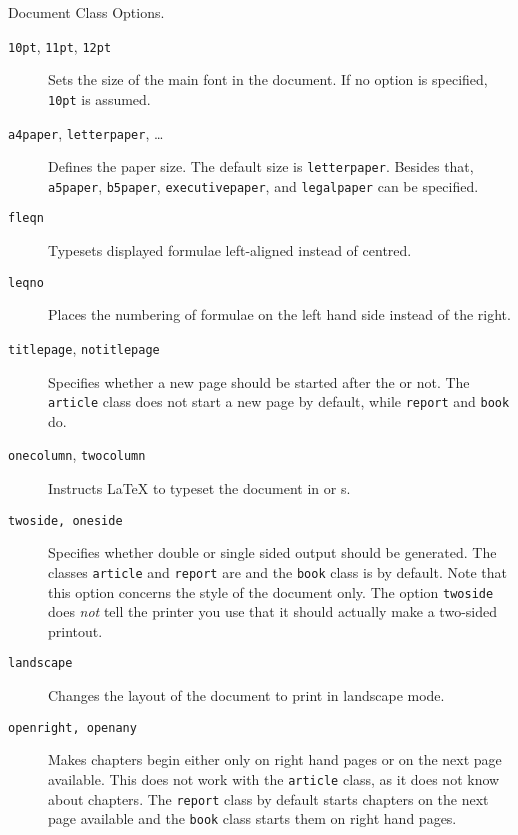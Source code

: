 \begin{table}[!bp]
\caption{Document Class Options.} \label{options}
\begin{lined}{12cm}
\begin{flushleft}
\begin{description}
\item[\normalfont\texttt{10pt}, \texttt{11pt}, \texttt{12pt}] \quad Sets the size
  of the main font in the document. If no option is specified,
  \texttt{10pt} is assumed.  
\item[\normalfont\texttt{a4paper}, \texttt{letterpaper}, \ldots] \quad Defines
  the paper size. The default size is \texttt{letterpaper}. Besides
  that, \texttt{a5paper}, \texttt{b5paper}, \texttt{executivepaper},
  and \texttt{legalpaper} can be specified.  
   

\item[\normalfont\texttt{fleqn}] \quad Typesets displayed formulae left-aligned
  instead of centred.

\item[\normalfont\texttt{leqno}] \quad Places the numbering of formulae on the
  left hand side instead of the right.

\item[\normalfont\texttt{titlepage}, \texttt{notitlepage}] \quad Specifies
  whether a new page should be started after the 
  or not. The \texttt{article} class does not start a new page by
  default, while \texttt{report} and \texttt{book} do.  

\item[\normalfont\texttt{onecolumn}, \texttt{twocolumn}] \quad Instructs \LaTeX{} to typeset the
  document in  or s.

\item[\normalfont\texttt{twoside, oneside}] \quad Specifies whether double or
  single sided output should be generated. The classes
  \texttt{article} and \texttt{report} are  and the
  \texttt{book} class is  by default. Note that this
  option concerns the style of the document only. The option
  \texttt{twoside} does \emph{not} tell the printer you use that it
  should actually make a two-sided printout.
\item[\normalfont\texttt{landscape}] \quad Changes the layout of the document to print in landscape mode.
\item[\normalfont\texttt{openright, openany}] \quad Makes chapters begin either
  only on right hand pages or on the next page available. This does
  not work with the \texttt{article} class, as it does not know about
  chapters. The \texttt{report} class by default starts chapters on
  the next page available and the \texttt{book} class starts them on
  right hand pages.

\end{description}
\end{flushleft}
\end{lined}
\end{table}

